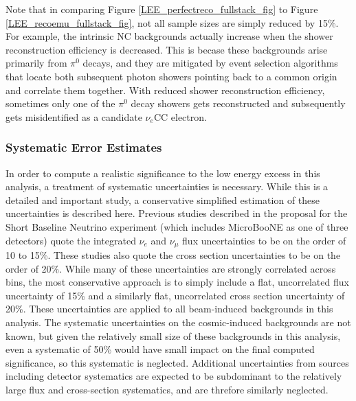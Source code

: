 Note that in comparing Figure \ref{LEE_perfectreco_fullstack_fig} to Figure \ref{LEE_recoemu_fullstack_fig}, not all sample sizes are simply reduced by 15\%. For example, the intrinsic NC backgrounds actually increase when the shower reconstruction efficiency is decreased. This is becase these backgrounds arise primarily from $\pi^0$ decays, and they are mitigated by event selection algorithms that locate both subsequent photon showers pointing back to a common origin and correlate them together. With reduced shower reconstruction efficiency, sometimes only one of the $\pi^0$ decay showers gets reconstructed and subsequently gets misidentified as a candidate $\nu_e$CC electron.

\subsubsection{Systematic Error Estimates}

In order to compute a realistic significance to the low energy excess in this analysis, a treatment of systematic uncertainties is necessary. While this is a detailed and important study, a conservative simplified estimation of these uncertainties is described here. Previous studies described in the proposal for the Short Baseline Neutrino experiment (which includes MicroBooNE as one of three detectors) \cite{SBNproposal} quote the integrated $\nu_e$ and $\nu_\mu$ flux uncertainties to be on the order of 10 to 15\%. These studies also quote the cross section uncertainties to be on the order of 20\%. While many of these uncertainties are strongly correlated across bins, the most conservative approach is to simply include a flat, uncorrelated flux uncertainty of 15\% and a similarly flat, uncorrelated cross section uncertainty of 20\%. These uncertainties are applied to all beam-induced backgrounds in this analysis. The systematic uncertainties on the cosmic-induced backgrounds are not known, but given the relatively small size of these backgrounds in this analysis, even a systematic of 50\% would have small impact on the final computed significance, so this systematic is neglected. Additional uncertainties from sources including detector systematics are expected to be subdominant to the relatively large flux and cross-section systematics, and are threfore similarly neglected.\\

